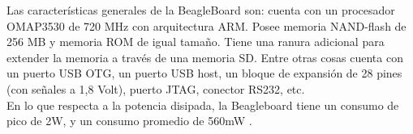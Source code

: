 Las características generales de la BeagleBoard son: cuenta con un procesador \\
OMAP3530 de 720 MHz con arquitectura ARM. Posee  memoria NAND-flash de 256 MB y memoria ROM de igual tamaño. Tiene una ranura adicional para extender la memoria a través de una memoria SD. Entre otras cosas cuenta con un puerto USB OTG, un puerto USB host, un bloque de expansión de 28 pines (con señales a 1,8 Volt), puerto JTAG, conector RS232, etc.\\
En lo que respecta a la potencia disipada, la Beagleboard tiene un consumo de pico de 2W, y un consumo promedio de 560mW \cite{consumo1} \cite{consumo2}.

\begin{figure}[H]
  \centering
\end{figure}
